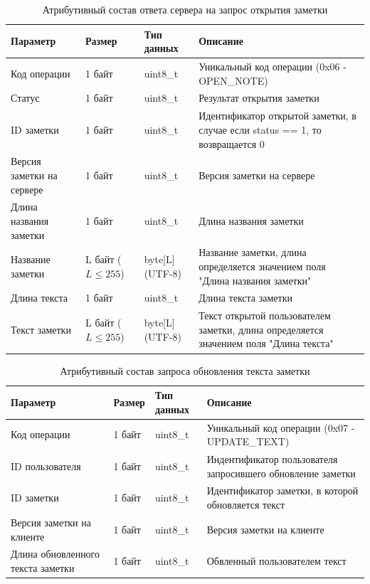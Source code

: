 \begin{table}[H]
    \centering
    \caption{Атрибутивный состав ответа сервера на запрос открытия заметки}
    \renewcommand{\arraystretch}{1.2}
    \begin{tabular}{|p{4cm}|p{2cm}|p{3cm}|p{6cm}|}
    \hline
    \textbf{Параметр} & \textbf{Размер} & \textbf{Тип данных} & \textbf{Описание} \\ \hline
    Код операции & 1 байт & uint8\_t & Уникальный код операции (0x06 - OPEN\_NOTE) \\ \hline
    Статус & 1 байт & uint8\_t & Результат открытия заметки \\ \hline
    ID заметки & 1 байт & uint8\_t & Идентификатор открытой заметки, в случае если status == 1, то возвращается 0 \\ \hline
    Версия заметки на сервере & 1 байт & uint8\_t & Версия заметки на сервере \\ \hline
    Длина названия заметки & 1 байт & uint8\_t & Длина названия заметки \\ \hline
    Название заметки & L байт (\(L \le 255\)) & byte[L] (UTF-8) & Название заметки, длина определяется значением поля "Длина названия заметки" \\ \hline
    Длина текста & 1 байт & uint8\_t & Длина текста заметки \\ \hline
    Текст заметки & L байт (\(L \le 255\)) & byte[L] (UTF-8) & Текст открытой пользователем заметки, длина определяется значением поля "Длина текста" \\ \hline
    \end{tabular}
    \label{tab:note_create_response_min}
\end{table}



\begin{table}[H]
    \centering
    \caption{Атрибутивный состав запроса обновления текста заметки}
    \begin{tabular}{|p{4cm}|p{2cm}|p{3cm}|p{6cm}|}
    \hline
    \textbf{Параметр} & \textbf{Размер} & \textbf{Тип данных} & \textbf{Описание} \\ \hline
    Код операции & 1 байт & uint8\_t & Уникальный код операции (0x07 - UPDATE\_TEXT) \\ \hline
    ID пользователя & 1 байт & uint8\_t & Индентификатор пользователя запросившего обновление заметки \\ \hline
    ID заметки & 1 байт & uint8\_t & Идентификатор заметки, в которой обновляется текст \\ \hline
    Версия заметки на клиенте & 1 байт & uint8\_t & Версия заметки на клиенте \\ \hline
    Длина обновленного текста заметки & 1 байт & uint8\_t & Обвленный пользователем текст \\ \hline
    \end{tabular}
    \label{tab:note_create_request}
\end{table}

